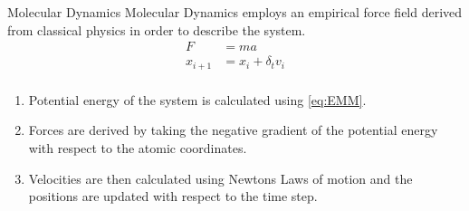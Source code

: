 \begin{frame}{Molecular Dynamics}
Molecular Dynamics employs an empirical force field derived from classical physics in order to describe the system.
\begin{equation}
\label{eq:EMM2}
\begin{split}
F &= m a \\
x_{i+1} &= x_i +\delta_t v_i \\
\end{split}
\end{equation}
\begin{enumerate}
\item Potential energy of the system is calculated using \cref{eq:EMM}.
\item Forces are derived by taking the negative gradient of the potential energy with respect to the atomic coordinates.
\item Velocities are then calculated using Newtons Laws of motion and the positions are updated with respect to the time step.
\end{enumerate}

\end{frame}